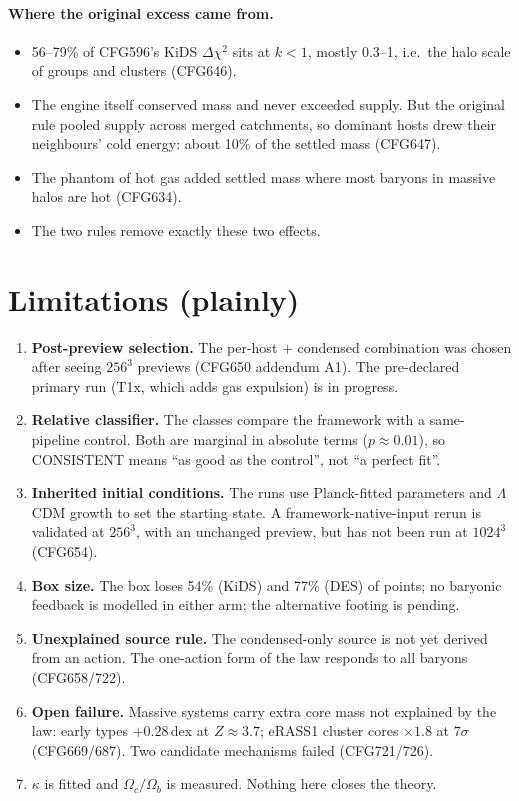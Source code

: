 \documentclass[10pt]{article}
\begin{document}
\paragraph{Where the original excess came from.}
\begin{itemize}
\item 56--79\% of CFG596's KiDS $\Delta\chi^2$ sits at $k<1$, mostly 0.3--1, i.e.\ the halo scale of groups and clusters (CFG646).
\item The engine itself conserved mass and never exceeded supply. But the original rule pooled supply across merged catchments, so dominant hosts drew their neighbours' cold energy: about 10\% of the settled mass (CFG647).
\item The phantom of hot gas added settled mass where most baryons in massive halos are hot (CFG634).
\item The two rules remove exactly these two effects.
\end{itemize}

\section{Limitations (plainly)}
\begin{enumerate}
\item \textbf{Post-preview selection.} The per-host + condensed combination was chosen after seeing $256^3$ previews (CFG650 addendum A1). The pre-declared primary run (T1x, which adds gas expulsion) is in progress.
\item \textbf{Relative classifier.} The classes compare the framework with a same-pipeline control. Both are marginal in absolute terms ($p\approx0.01$), so CONSISTENT means ``as good as the control'', not ``a perfect fit''.
\item \textbf{Inherited initial conditions.} The runs use Planck-fitted parameters and $\Lambda$CDM growth to set the starting state. A framework-native-input rerun is validated at $256^3$, with an unchanged preview, but has not been run at $1024^3$ (CFG654).
\item \textbf{Box size.} The box loses 54\% (KiDS) and 77\% (DES) of points; no baryonic feedback is modelled in either arm; the alternative footing is pending.
\item \textbf{Unexplained source rule.} The condensed-only source is not yet derived from an action. The one-action form of the law responds to all baryons (CFG658/722).
\item \textbf{Open failure.} Massive systems carry extra core mass not explained by the law: early types $+0.28$\,dex at $Z\approx3.7$; eRASS1 cluster cores $\times1.8$ at $7\sigma$ (CFG669/687). Two candidate mechanisms failed (CFG721/726).
\item $\kappa$ is fitted and $\Omega_c/\Omega_b$ is measured. Nothing here closes the theory.
\end{enumerate}
\end{document}
